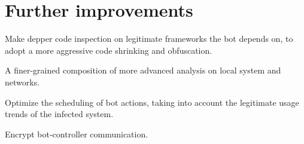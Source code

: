 \section{Further improvements}
\label{sec:further-improvements}

Make depper code inspection on legitimate frameworks the bot depends on, to adopt a more aggressive code shrinking and obfuscation.

A finer-grained composition of more advanced analysis on local system and networks.

Optimize the scheduling of bot actions, taking into account the legitimate usage trends of the infected system.

Encrypt bot-controller communication.

